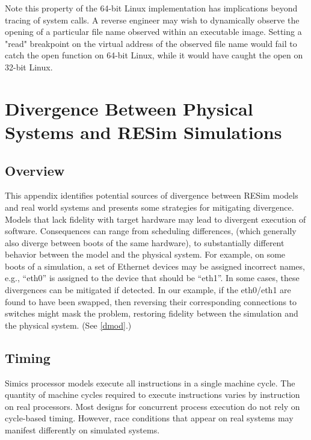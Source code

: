 \documentclass[titlepage]{article}
\begin{document}
\begin{appendices}
Note this property of the 64-bit Linux implementation has implications beyond tracing of system calls.  A reverse
engineer may wish to dynamically observe the opening of a particular file name observed within an executable image.
Setting a "read" breakpoint on the virtual address of the observed file name would fail to catch the open function
on 64-bit Linux, while it would have caught the open on 32-bit Linux.



\section{Divergence Between Physical Systems and RESim Simulations}
\label{divergence}
\subsection{Overview}
This appendix identifies potential sources of divergence between RESim models and
real world systems and presents some strategies for mitigating divergence.  
Models that lack fidelity with target hardware may lead to divergent execution of software.
Consequences can range from scheduling differences, (which generally also diverge between
boots of the same hardware), to substantially different behavior between the model and
the physical system.
For example, on some boots of a simulation, a set of Ethernet devices may be assigned incorrect names, e.g., ``eth0''
is assigned to the device that should be ``eth1''.  In some cases, these
divergences can be 
mitigated if detected.  In our example, if the eth0/eth1 are found to have been
swapped, then reversing their corresponding connections to switches might mask the problem,
restoring fidelity between the simulation and the physical system.  (See \ref{dmod}.)

\subsection{Timing}
Simics processor models execute all instructions in a single machine cycle.  The quantity
of machine cycles required to execute instructions varies by instruction on real processors.
Most designs for concurrent process execution do not rely on cycle-based timing.  However,
race conditions that appear on real systems may manifest differently on simulated systems.


\end{appendices}
\end{document}
